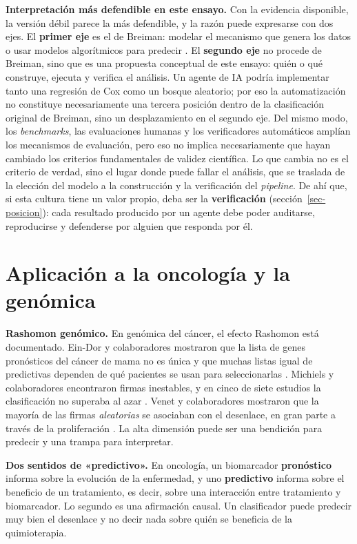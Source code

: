\documentclass[11pt,a4paper]{article}
\begin{document}
\textbf{Interpretación más defendible en este ensayo.} Con la evidencia disponible, la versión débil parece la más defendible, y la razón puede expresarse con dos ejes. El \textbf{primer eje} es el de Breiman: modelar el mecanismo que genera los datos o usar modelos algorítmicos para predecir \autocite[231]{breiman2001}. El \textbf{segundo eje} no procede de Breiman, sino que es una propuesta conceptual de este ensayo: quién o qué construye, ejecuta y verifica el análisis. Un agente de IA podría implementar tanto una regresión de Cox como un bosque aleatorio; por eso la automatización no constituye necesariamente una tercera posición dentro de la clasificación original de Breiman, sino un desplazamiento en el segundo eje. Del mismo modo, los \emph{benchmarks}, las evaluaciones humanas y los verificadores automáticos amplían los mecanismos de evaluación, pero eso no implica necesariamente que hayan cambiado los criterios fundamentales de validez científica. Lo que cambia no es el criterio de verdad, sino el lugar donde puede fallar el análisis, que se traslada de la elección del modelo a la construcción y la verificación del \emph{pipeline}. De ahí que, si esta cultura tiene un valor propio, deba ser la \textbf{verificación} (sección~\ref{sec-posicion}): cada resultado producido por un agente debe poder auditarse, reproducirse y defenderse por alguien que responda por él.

\section{Aplicación a la oncología y la genómica}\label{sec-oncologia}

\textbf{Rashomon genómico.} En genómica del cáncer, el efecto Rashomon está documentado. Ein-Dor y colaboradores mostraron que la lista de genes pronósticos del cáncer de mama no es única y que muchas listas igual de predictivas dependen de qué pacientes se usan para seleccionarlas \autocite{eindor2005}. Michiels y colaboradores encontraron firmas inestables, y en cinco de siete estudios la clasificación no superaba al azar \autocite{michiels2005}. Venet y colaboradores mostraron que la mayoría de las firmas \emph{aleatorias} se asociaban con el desenlace, en gran parte a través de la proliferación \autocite{venet2011}. La alta dimensión puede ser una bendición para predecir y una trampa para interpretar.

\textbf{Dos sentidos de «predictivo».} En oncología, un biomarcador \textbf{pronóstico} informa sobre la evolución de la enfermedad, y uno \textbf{predictivo} informa sobre el beneficio de un tratamiento, es decir, sobre una interacción entre tratamiento y biomarcador. Lo segundo es una afirmación causal. Un clasificador puede predecir muy bien el desenlace y no decir nada sobre quién se beneficia de la quimioterapia.
\end{document}
